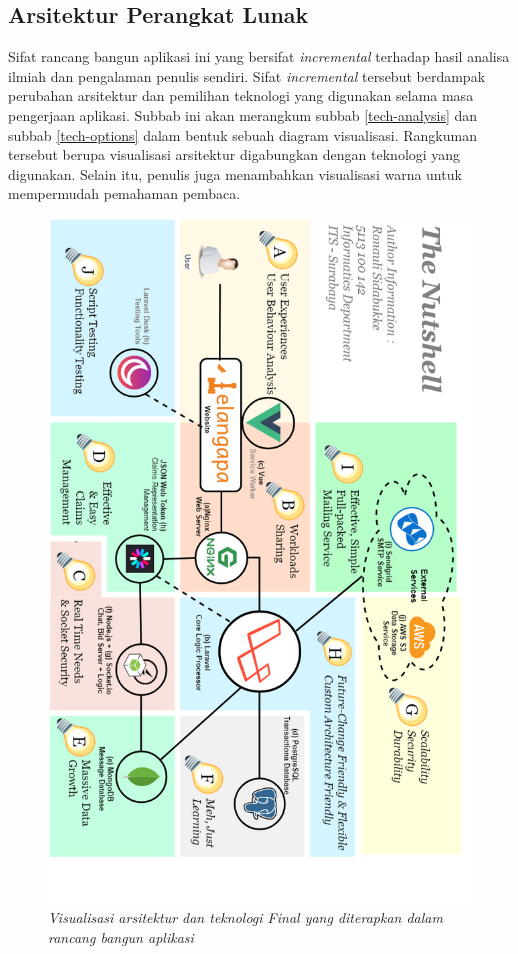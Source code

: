 
\subsection{Arsitektur Perangkat Lunak}
	\label{final-arch-tech}
	Sifat rancang bangun aplikasi ini yang bersifat \textit{incremental} terhadap hasil analisa ilmiah dan pengalaman penulis sendiri. Sifat \textit{incremental} tersebut berdampak perubahan arsitektur dan pemilihan teknologi yang digunakan selama masa pengerjaan aplikasi. Subbab ini akan merangkum subbab \ref{tech-analysis} dan subbab \ref{tech-options} dalam bentuk sebuah diagram visualisasi. Rangkuman tersebut berupa visualisasi arsitektur digabungkan dengan teknologi yang digunakan. Selain itu, penulis juga menambahkan visualisasi warna untuk mempermudah pemahaman pembaca.
	
	\begin{figure}[H]
		\centering
		\includegraphics[width=.8\textwidth]{images/bab3/arsitektur-app-pl_2.png}
		\caption{\textit{Visualisasi arsitektur dan teknologi Final yang diterapkan dalam rancang bangun aplikasi}}
			\label{final-arch-tech-figure}
	\end{figure}
	
	

